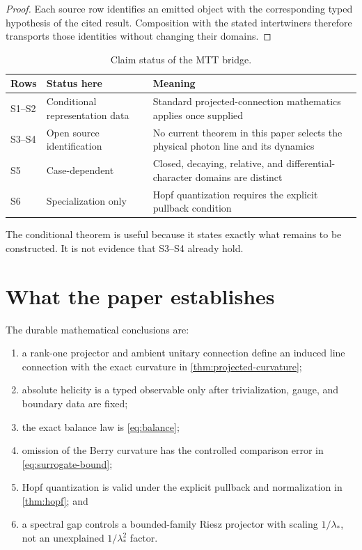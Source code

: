 \documentclass[11pt]{article}
\begin{document}
\begin{proof}
Each source row identifies an emitted object with the corresponding typed
hypothesis of the cited result.  Composition with the stated intertwiners
therefore transports those identities without changing their domains.
\end{proof}

\begin{table}[ht]
\centering
\small
\begin{tabular}{>{\raggedright\arraybackslash}p{}
                >{\raggedright\arraybackslash}p{}
                >{\raggedright\arraybackslash}p{}}
\toprule
Rows & Status here & Meaning \\
\midrule
S1--S2 & Conditional representation data & Standard projected-connection
mathematics applies once supplied \\
S3--S4 & Open source identification & No current theorem in this paper selects
the physical photon line and its dynamics \\
S5 & Case-dependent & Closed, decaying, relative, and differential-character
domains are distinct \\
S6 & Specialization only & Hopf quantization requires the explicit pullback
condition \\
\bottomrule
\end{tabular}
\caption{Claim status of the MTT bridge.}
\label{tab:mtt-status}
\end{table}

The conditional theorem is useful because it states exactly what remains to be
constructed.  It is not evidence that S3--S4 already hold.

\section{What the paper establishes}

\vspace{0.4\baselineskip}
The durable mathematical conclusions are:
\begin{enumerate}
\item a rank-one projector and ambient unitary connection define an induced
line connection with the exact curvature in
\cref{thm:projected-curvature};
\item absolute helicity is a typed observable only after trivialization,
gauge, and boundary data are fixed;
\item the exact balance law is \cref{eq:balance};
\item omission of the Berry curvature has the controlled comparison error in
\cref{eq:surrogate-bound};
\item Hopf quantization is valid under the explicit pullback and normalization
in \cref{thm:hopf}; and
\item a spectral gap controls a bounded-family Riesz projector with scaling
\(1/\lambda_*\), not an unexplained \(1/\lambda_*^2\) factor.
\end{enumerate}
\end{document}
